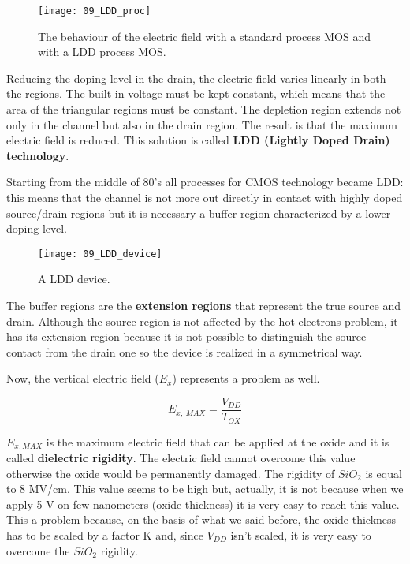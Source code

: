 \documentclass[a4paper, 12pt, twoside, openright]{report}
\begin{document}
{	\begin{figure}[H]
	\centering
	\texttt{[image: 09\_LDD\_proc]}
	\caption{The behaviour of the electric field with a standard process MOS and with a LDD process MOS.}
	\label{}
	\end{figure}

Reducing the doping level in the drain, the electric field varies linearly in both the regions. The built-in voltage must be kept constant, which means that the area of the triangular regions must be constant. The depletion region extends not only in the channel but also in the drain region. The result is that the maximum electric field is reduced. This solution is called \textbf{LDD (Lightly Doped Drain) technology}.

Starting from the middle of 80's all processes for CMOS technology became LDD: this means that the channel is not more out directly in contact with highly doped source/drain regions but it is necessary a buffer region characterized by a lower doping level.

 	\begin{figure}[H]
	\centering
	\texttt{[image: 09\_LDD\_device]}
	\caption{A LDD device.}
	\label{}
	\end{figure}

The buffer regions are the \textbf{extension regions} that represent the true source and drain. Although the source region is not affected by the hot electrons problem, it has its extension region because it is not possible to distinguish the source contact from the drain one so the device is realized in a symmetrical way.

Now, the vertical electric field ($E_{x}$) represents a problem as well.

\begin{equation}
E_{x,\ MAX} = \frac{V_{DD}}{T_{OX}}
\end{equation}

$E_{x, MAX}$ is the maximum electric field that can be applied at the oxide and it is called \textbf{dielectric rigidity}. The electric field cannot overcome this value otherwise the oxide would be permanently damaged. The rigidity of $SiO_{2}$ is equal to 8 MV/cm. This value seems to be high but, actually, it is not because when we apply 5 V on few nanometers (oxide thickness) it is very easy to reach this value. This a problem because, on the basis of what we said before, the oxide thickness has to be scaled by a factor K and, since $V_{DD}$ isn't scaled, it is very easy to overcome the $SiO_{2}$ rigidity. \\


}
\end{document}
